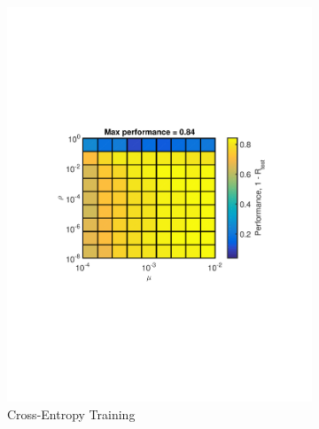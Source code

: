 \documentclass[journal,a4paper,onecolumn,11pt]{IEEEtran}
\begin{document}
\begin{figure}[!h]
	\begin{subfigure}{.5\textwidth}
		\centering
		\includegraphics[clip, trim=0cm .25cm 0cm .25cm, width=\textwidth]{para_opt_fnt_ce.pdf}
		\caption{Cross-Entropy Training}
		\label{fig:para_opt_fnt_ce}
	\end{subfigure}
	\begin{subfigure}{.5\textwidth}
		\centering

\end{subfigure}
\end{figure}
\end{document}
